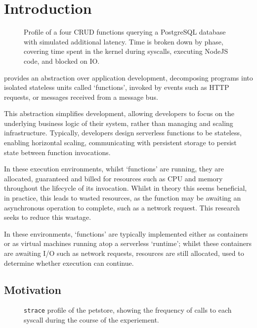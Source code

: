 \chapter{Introduction}

\begin{figure}
    \begin{center}
        
    \end{center}
    \caption{Profile of a four CRUD \faas{} functions querying a PostgreSQL database with simulated additional latency. Time is broken down by phase, covering time spent in the kernel during syscalls, executing NodeJS code, and blocked on IO.}
    \label{fig:faas-profile-intro-experiment}
\end{figure}

\faasxlong{} provides an abstraction over application development, decomposing programs into isolated stateless units called `functions', invoked by events such as HTTP requests, or messages received from a message bus\cite{ibmWhatFaaSFunctionasaService2024}.

This abstraction simplifies development, allowing developers to focus on the underlying business logic of their system, rather than managing and scaling infrastructure. Typically, developers design serverless functions to be stateless\cite{ggailey777AzureFunctionsBest2022}, enabling horizontal scaling\cite{ngoEvaluatingScalabilityElasticity2022}, communicating with persistent storage to persist state between function invocations.

In these execution environments, whilst `functions' are running, they are allocated, guaranteed and billed for resources such as CPU and memory throughout the lifecycle of its invocation. Whilst in theory this seems beneficial, in practice, this leads to wasted resources, as the function may be awaiting an asynchronous operation to complete, such as a network request. This research seeks to reduce this wastage.

In these environments, `functions' are typically implemented either as containers or as virtual machines running atop a serverless `runtime'; whilst these containers are awaiting I/O such as network requests, resources are still allocated, used to determine whether execution can continue.

\section{Motivation}
\begin{figure}
    \begin{center}
        
    \end{center}
    \caption{\texttt{strace} profile of the \faas{} petstore, showing the frequency of calls to each syscall during the course of the experiement.}
    \label{fig:faas-strace-freq-intro-experiment}
\end{figure}

